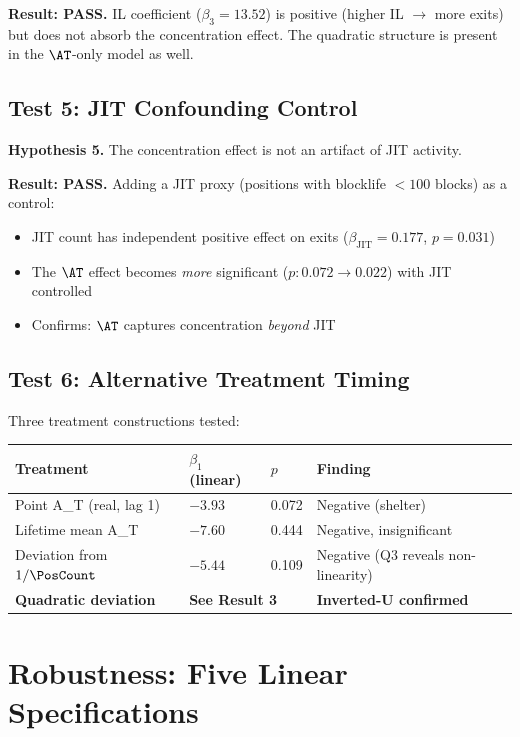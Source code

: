 \textbf{Result: PASS.} IL coefficient ($\beta_3 = 13.52$) is positive
(higher IL $\to$ more exits) but does not absorb the concentration effect.
The quadratic structure is present in the $\AT$-only model as well.

\subsection{Test 5: JIT Confounding Control}

\textbf{Hypothesis 5.} The concentration effect is not an artifact of JIT
activity.

\textbf{Result: PASS.} Adding a JIT proxy (positions with blocklife $< 100$
blocks) as a control:
\begin{itemize}
  \item JIT count has independent positive effect on exits
    ($\beta_{\text{JIT}} = 0.177$, $p = 0.031$)
  \item The $\AT$ effect becomes \emph{more} significant
    ($p: 0.072 \to 0.022$) with JIT controlled
  \item Confirms: $\AT$ captures concentration \emph{beyond} JIT
\end{itemize}

\subsection{Test 6: Alternative Treatment Timing}

Three treatment constructions tested:

\begin{center}
\begin{tabular}{@{}llll@{}}
\toprule
Treatment & $\beta_1$ (linear) & $p$ & Finding \\
\midrule
Point A\_T (real, lag 1) & $-3.93$ & 0.072 & Negative (shelter) \\
Lifetime mean A\_T & $-7.60$ & 0.444 & Negative, insignificant \\
Deviation from $1/\PosCount$ & $-5.44$ & 0.109 & Negative (Q3 reveals non-linearity) \\
\textbf{Quadratic deviation} & \multicolumn{2}{l}{\textbf{See Result 3}} & \textbf{Inverted-U confirmed} \\
\bottomrule
\end{tabular}
\end{center}

\section{Robustness: Five Linear Specifications}\label{app:robustness}

